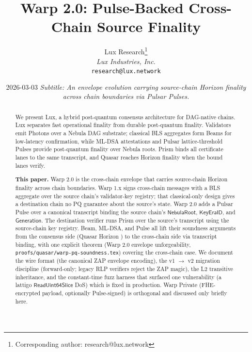 \documentclass[11pt,a4paper]{article}
\title{Warp 2.0: Pulse-Backed Cross-Chain Source Finality}
\author{
Lux Research\thanks{Corresponding author: research@lux.network}\\
\textit{Lux Industries, Inc.}\\
\texttt{research@lux.network}
}
\date{2026-03-03 \quad\textit{Subtitle: An envelope evolution carrying source-chain Horizon finality across chain boundaries via Pulsar Pulses.}}
\begin{document}
\luxcoverpage

\begin{abstract}
\noindent We present Lux, a hybrid post-quantum consensus architecture for DAG-native chains. Lux separates fast operational finality from durable post-quantum finality. Validators emit Photons over a Nebula DAG substrate; classical BLS aggregates form Beams for low-latency confirmation, while ML-DSA attestations and Pulsar lattice-threshold Pulses provide post-quantum finality over Nebula roots. Prism binds all certificate lanes to the same transcript, and Quasar reaches Horizon finality when the bound lanes verify.

\textbf{This paper.} Warp 2.0 is the cross-chain envelope that carries source-chain Horizon finality across chain boundaries. Warp 1.x \cite{lp075} signs cross-chain messages with a BLS aggregate over the source chain's validator-key registry; that classical-only design gives a destination chain no PQ guarantee about the source's state. Warp 2.0 adds a Pulsar Pulse over a canonical transcript binding the source chain's $\mathsf{NebulaRoot}$, $\mathsf{KeyEraID}$, and $\mathsf{Generation}$. The destination verifier runs Prism over the source's transcript using the source-chain key registry. Beam, ML-DSA, and Pulse all lift their soundness arguments from the consensus side (Quasar Horizon \cite{luxquasarhorizon,lp020}) to the cross-chain side via transcript binding, with one explicit theorem (Warp 2.0 envelope unforgeability, \texttt{proofs/quasar/warp-pq-soundness.tex}) covering the cross-chain case. We document the wire format (the canonical ZAP envelope encoding), the v1 $\to$ v2 migration discipline (forward-only; legacy RLP verifiers reject the ZAP magic), the L2 transitive inheritance, and the constant-time fuzz harness that surfaced one vulnerability (a lattigo $\mathsf{ReadUint64Slice}$ DoS) which is fixed in production. Warp Private (FHE-encrypted payload, optionally Pulse-signed) is orthogonal and discussed only briefly here.
\end{abstract}

\tableofcontents
\newpage












\end{document}
